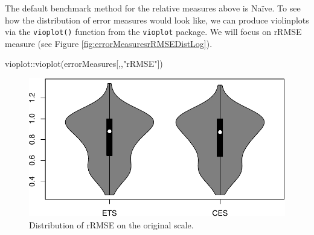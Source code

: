 \documentclass[
]{book}
\newenvironment{Shaded}{\begin{snugshade}}{\end{snugshade}}
\newcommand{\AttributeTok}[1]{\textcolor[rgb]{0.77,0.63,0.00}{#1}}
\newcommand{\CommentTok}[1]{\textcolor[rgb]{0.56,0.35,0.01}{\textit{#1}}}
\newcommand{\ConstantTok}[1]{\textcolor[rgb]{0.00,0.00,0.00}{#1}}
\newcommand{\DecValTok}[1]{\textcolor[rgb]{0.00,0.00,0.81}{#1}}
\newcommand{\FunctionTok}[1]{\textcolor[rgb]{0.00,0.00,0.00}{#1}}
\newcommand{\NormalTok}[1]{#1}
\newcommand{\OtherTok}[1]{\textcolor[rgb]{0.56,0.35,0.01}{#1}}
\newcommand{\SpecialCharTok}[1]{\textcolor[rgb]{0.00,0.00,0.00}{#1}}
\newcommand{\StringTok}[1]{\textcolor[rgb]{0.31,0.60,0.02}{#1}}
\theoremstyle{definition}
\theoremstyle{definition}
\theoremstyle{definition}
\theoremstyle{definition}
\theoremstyle{remark}
\begin{document}
\begin{Shaded}
\end{Shaded}

The default benchmark method for the relative measures above is Naïve. To see how the distribution of error measures would look like, we can produce violinplots via the \texttt{vioplot()} function from the \texttt{vioplot} package. We will focus on rRMSE measure (see Figure \ref{fig:errorMeasuresrRMSEDistLog}).

\begin{Shaded}
\begin{Highlighting}[]
\NormalTok{vioplot}\SpecialCharTok{::}\FunctionTok{vioplot}\NormalTok{(errorMeasures[,,}\StringTok{"rRMSE"}\NormalTok{])}
\end{Highlighting}
\end{Shaded}

\begin{figure}
\centering
\includegraphics{Svetunkov--2022----ADAM_files/figure-latex/errorMeasuresrRMSEDist-1.pdf}
\caption{\label{fig:errorMeasuresrRMSEDist}Distribution of rRMSE on the original scale.}
\end{figure}
\end{document}
